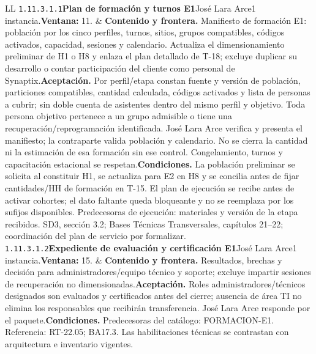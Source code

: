 \begin{longtable}{L{\tabcolsep\relax}L{\tabcolsep\relax}}
\texttt{1.\allowbreak{}11.\allowbreak{}3.\allowbreak{}1.\allowbreak{}1}\newline{}\textbf{Plan de formación y turnos E1}\newline{}José Lara Arce\newline{}1 instancia.\newline{}\textbf{Ventana:} 11. & \textbf{Contenido y frontera.} Manifiesto de formación E1: población por los cinco perfiles, turnos, sitios, grupos compatibles, códigos activados, capacidad, sesiones y calendario. Actualiza el dimensionamiento preliminar de H1 o H8 y enlaza el plan detallado de T-18; excluye duplicar su desarrollo o contar participación del cliente como personal de Synaptix.\newline{}\textbf{Aceptación.} Por perfil/etapa constan fuente y versión de población, particiones compatibles, cantidad calculada, códigos activados y lista de personas a cubrir; sin doble cuenta de asistentes dentro del mismo perfil y objetivo. Toda persona objetivo pertenece a un grupo admisible o tiene una recuperación/reprogramación identificada. José Lara Arce verifica y presenta el manifiesto; la contraparte valida población y calendario. No se cierra la cantidad ni la estimación de esa formación sin ese control. Congelamiento, turnos y capacitación estacional se respetan.\newline{}\textbf{Condiciones.} La población preliminar se solicita al constituir H1, se actualiza para E2 en H8 y se concilia antes de fijar cantidades/HH de formación en T-15. El plan de ejecución se recibe antes de activar cohortes; el dato faltante queda bloqueante y no se reemplaza por los sufijos disponibles. Predecesoras de ejecución: materiales y versión de la etapa recibidos. SD3, sección 3.2; Bases Técnicas Transversales, capítulos 21--22; coordinación del plan de servicio por formalizar.\\\hline
\texttt{1.\allowbreak{}11.\allowbreak{}3.\allowbreak{}1.\allowbreak{}2}\newline{}\textbf{Expediente de evaluación y certificación E1}\newline{}José Lara Arce\newline{}1 instancia.\newline{}\textbf{Ventana:} 15. & \textbf{Contenido y frontera.} Resultados, brechas y decisión para administradores/equipo técnico y soporte; excluye impartir sesiones de recuperación no dimensionadas.\newline{}\textbf{Aceptación.} Roles administradores/técnicos designados son evaluados y certificados antes del cierre; ausencia de área TI no elimina los responsables que recibirán transferencia. José Lara Arce responde por el paquete.\newline{}\textbf{Condiciones.} Predecesoras del catálogo: FORMACION-E1. Referencia: RT-22.05; BA17.3. Las habilitaciones técnicas se contrastan con arquitectura e inventario vigentes.\\\hline

\end{longtable}
